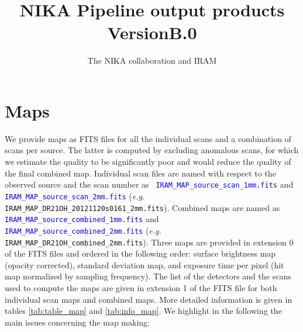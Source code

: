 \documentclass[a4paper,10pt]{article}
\title{NIKA Pipeline output products VersionB.0}
\author{The NIKA collaboration and IRAM}
\begin{document}
\maketitle


\section{Maps}
We provide maps as FITS files for all the individual scans and a combination
of scans per source. The latter is computed by excluding anomalous scans, for
which we estimate the quality to be significantly poor and would reduce the
quality of the final combined map. Individual scan files are named with
respect to the observed source and the scan number as \textcolor{blue}{{\tt
    IRAM\_MAP\_source\_scan\_1mm.fits}} and \textcolor{blue}{{\tt
    IRAM\_MAP\_source\_scan\_2mm.fits}} ({\it e.g.} {\tt
  IRAM\_MAP\_DR21OH\_20121120s0161\_2mm.fits}). Combined maps are named as
\textcolor{blue}{{\tt IRAM\_MAP\_source\_combined\_1mm.fits}} and
\textcolor{blue}{{\tt IRAM\_MAP\_source\_combined\_2mm.fits}} ({\it e.g.} {\tt
  IRAM\_MAP\_DR21OH\_combined\_2mm.fits}).  Three maps are provided in
extension 0 of the FITS files and ordered in the following order: surface
brightness map (opacity corrected), standard deviation map, and exposure time
per pixel (hit map normalized by sampling frequency).  The list of the
detectors and the scans used to compute the maps are given in extension 1 of
the FITS file for both individual scan maps and combined maps.  More detailed
information is given in tables \ref{tab:table_map} and \ref{tab:info_map}. We
highlight in the following the main issues concerning the map making:
\end{document}
